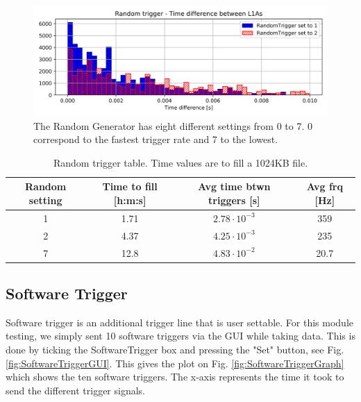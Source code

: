\begin{figure}[htbp!] 
\centering    
\includegraphics[width=\textwidth]{Raster/RandomTriggerTimeDifferences.png}
\caption[Random Trigger]{The Random Generator has eight different settings from 0 to 7. 0 correspond to the fastest trigger rate and 7 to the lowest.}
\label{fig:RandomGenerator}
\end{figure}

\begin{table}[htbp!] 
\caption{Random trigger table. Time values are to fill a 1024KB file.}
\centering
\label{table:RandomTrigger}
\begin{tabular}{c c c c}
\toprule
Random setting & Time to fill [h:m:s] & Avg time btwn triggers [s] & Avg frq [Hz] \\
\midrule
1 & 1.71 & $2.78\cdot10^{-3}$ & 359 \\
2 & 4.37 & $4.25\cdot10^{-3}$ & 235 \\
7 & 12.8 & $4.83\cdot10^{-2}$ & 20.7 \\
\bottomrule
\end{tabular}
\end{table}

\subsection{Software Trigger}
\label{Software Trigger}

Software trigger is an additional trigger line that is user settable. For this module testing, we simply sent 10 software triggers via the GUI while taking data. This is done by ticking the SoftwareTrigger box and pressing the "Set" button, see Fig. \ref{fig:SoftwareTriggerGUI}. This gives the plot on Fig. \ref{fig:SoftwareTriggerGraph} which shows the ten software triggers. The x-axis represents the time it took to send the different trigger signals.

